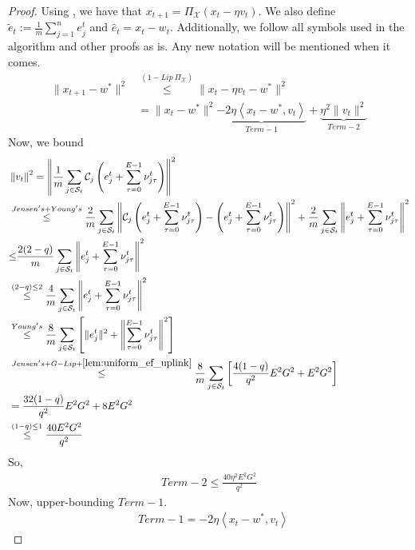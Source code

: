 \documentclass{article} %
\def\C{{\mathcal C}}
\def\S{{\mathcal S}}
\newcommand{\inner}[2]{\left\langle #1, #2 \right\rangle}
\begin{document}
\begin{proof}
    Using , we have that $x_{t+1} = \Pi_{\mathcal{X}}(x_t - \eta v_t)$. We also define $\tilde{e}_t := \frac{1}{m}\sum_{j =1}^{n}e_j^t$ and $ \hat{e}_t = x_t - w_t$. Additionally, we follow all symbols used in the algorithm and other proofs as is. Any new notation will be mentioned when it comes.
    \begin{align*}
        \|x_{t+1} - w^*\|^2 &\overset{(1-Lip\ \Pi_\mathcal{X})}{\leq} \|x_t - \eta v_t - w^*\|^2
        \\
        & = \|x_t - w^*\|^2 \underbrace{- 2\eta \inner{x_t - w^*}{v_t}}_{Term-1} + \underbrace{\eta^2 \|v_t\|^2}_{Term-2}
    \end{align*}
    Now, we bound
    \begin{align*}
        &\left\|v_t\right\|^2 = \left\|\frac{1}{m}\sum_{j \in \S_t}\C_j\left(e_j^t + \sum_{\tau=0}^{E-1}\nu_{j\tau}^t\right)\right\|^2
        \\
        &\overset{Jensen's+ Young's}{\leq} \frac{2}{m}\sum_{j \in \S_t}\left\|\C_j\left(e_j^t + \sum_{\tau=0}^{E-1}\nu_{j\tau}^t\right) - \left(e_j^t + \sum_{\tau=0}^{E-1}\nu_{j\tau}^t\right) \right\|^2 + \frac{2}{m}\sum_{j \in \S_t}\left\|e_j^t + \sum_{\tau=0}^{E-1}\nu_{j\tau}^t\right\|^2
        \\
        &{\leq}\frac{2(2-q)}{m}\sum_{j\in \S_t}\left\|e_j^t + \sum_{\tau=0}^{E-1}\nu_{j\tau}^t\right\|^2
        \\
        &\overset{(2-q)\leq2}{\leq} \frac{4}{m}\sum_{j\in \S_t}\left\|e_j^t + \sum_{\tau=0}^{E-1}\nu_{j\tau}^t\right\|^2
        \\
        &\overset{Young's}{\leq}\frac{8}{m}\sum_{j\in \S_t}\left[\|e_j^t\|^2+ \left\|\sum_{\tau=0}^{E-1}\nu_{j\tau}^t\right\|^2\right]
        \\
        &\overset{Jensen's+G-Lip+\Cref{lem:uniform_ef_uplink}}{\leq}\frac{8}{m}\sum_{j\in \S_t}\left[\frac{4(1-q)}{ q^2}E^2G^2 + E^2G^2\right]
        \\
        &=\frac{32(1-q)}{ q^2}E^2G^2 + 8E^2G^2
        \\
        &\overset{(1-q)\leq1}{\leq}\frac{40 E^2G^2}{ q^2}
    \end{align*}
    So, \begin{align*}
        Term-2 \leq \frac{40 \eta^2 E^2G^2}{ q^2}
    \end{align*}
    Now, upper-bounding $Term-1$.
    \begin{align*}
        &Term-1 = - 2\eta \inner{x_t - w^*}{v_t}

\end{align*}
\end{proof}
\end{document}
